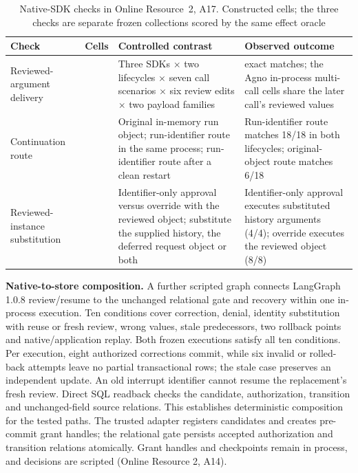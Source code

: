 \documentclass[pdflatex,sn-basic]{sn-jnl}
\begin{document}
\begin{table}[htbp]
\centering\small
\caption{Native-{SDK} checks in Online Resource~2, A17. Constructed cells; the three checks are separate frozen collections scored by the same effect oracle}
\label{tab:sdk-checks}
\begin{tabularx}{\textwidth}{@{}>{\raggedright\arraybackslash}p{}>{\raggedright\arraybackslash}p{}>{\raggedright\arraybackslash}X>{\raggedright\arraybackslash}p{}@{}}
\toprule
Check & Cells & Controlled contrast & Observed outcome \\
\midrule
Reviewed-argument delivery & 504 & Three {SDK}s $\times$ two lifecycles $\times$ seven call scenarios $\times$ six review edits $\times$ two payload families & 444 exact matches; the Agno in-process multi-call cells share the later call's reviewed values \\
Continuation route & 54 & Original in-memory run object; run-identifier route in the same process; run-identifier route after a clean restart & Run-identifier route matches 18/18 in both lifecycles; original-object route matches 6/18 \\
Reviewed-instance substitution & 16 & Identifier-only approval versus override with the reviewed object; substitute the supplied history, the deferred request object or both & Identifier-only approval executes substituted history arguments (4/4); override executes the reviewed object (8/8) \\
\bottomrule
\end{tabularx}
\end{table}

\textbf{Native-to-store composition.} A further scripted graph connects LangGraph 1.0.8 review/resume to the unchanged relational gate and recovery within one in-process execution. Ten conditions cover correction, denial, identity substitution with reuse or fresh review, wrong values, stale predecessors, two rollback points and native/application replay. Both frozen executions satisfy all ten conditions. Per execution, eight authorized corrections commit, while six invalid or rolled-back attempts leave no partial transactional rows; the stale case preserves an independent update. An old interrupt identifier cannot resume the replacement's fresh review. Direct SQL readback checks the candidate, authorization, transition and unchanged-field source relations. This establishes deterministic composition for the tested paths. The trusted adapter registers candidates and creates pre-commit grant handles; the relational gate persists accepted authorization and transition relations atomically. Grant handles and checkpoints remain in process, and decisions are scripted (Online Resource 2, A14).
\end{document}
